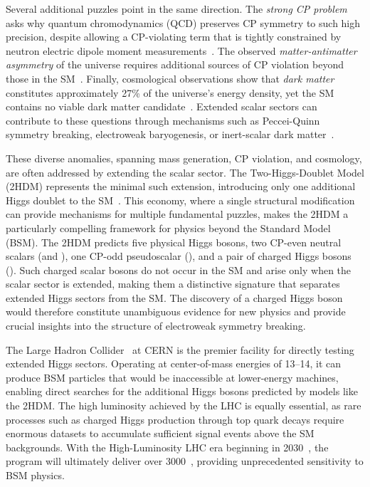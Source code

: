 Several additional puzzles point in the same direction. The \textit{strong CP problem} asks why quantum chromodynamics (QCD) preserves CP symmetry to such high precision, despite allowing a CP-violating term that is tightly constrained by neutron electric dipole moment measurements~\cite{Kim:2008hd,Abel:2020pzs}. The observed \textit{matter-antimatter asymmetry} of the universe requires additional sources of CP violation beyond those in the SM~\cite{Sakharov:1967dj}. Finally, cosmological observations show that \textit{dark matter} constitutes approximately 27\% of the universe's energy density, yet the SM contains no viable dark matter candidate~\cite{Planck:2018vyg}. Extended scalar sectors can contribute to these questions through mechanisms such as Peccei-Quinn symmetry breaking, electroweak baryogenesis, or inert-scalar dark matter~\cite{Peccei:1977hh,Peccei:1977ur,Morrissey:2012db,Deshpande:1977rw}.

These diverse anomalies, spanning mass generation, CP violation, and cosmology, are often addressed by extending the scalar sector. The Two-Higgs-Doublet Model (2HDM) represents the minimal such extension, introducing only one additional Higgs doublet to the SM~\cite{Branco:2011iw}. This economy, where a single structural modification can provide mechanisms for multiple fundamental puzzles, makes the 2HDM a particularly compelling framework for physics beyond the Standard Model (BSM). The 2HDM predicts five physical Higgs bosons, two CP-even neutral scalars (\Ph and \PH), one CP-odd pseudoscalar (\PA), and a pair of charged Higgs bosons (\PHpm). Such charged scalar bosons do not occur in the SM and arise only when the scalar sector is extended, making them a distinctive signature that separates extended Higgs sectors from the SM. The discovery of a charged Higgs boson would therefore constitute unambiguous evidence for new physics and provide crucial insights into the structure of electroweak symmetry breaking.

The Large Hadron Collider~\cite{Evans:2008zzb} at CERN is the premier facility for directly testing extended Higgs sectors. Operating at center-of-mass energies of 13--14\TeV, it can produce BSM particles that would be inaccessible at lower-energy machines, enabling direct searches for the additional Higgs bosons predicted by models like the 2HDM. The high luminosity achieved by the LHC is equally essential, as rare processes such as charged Higgs production through top quark decays require enormous datasets to accumulate sufficient signal events above the SM backgrounds. With the High-Luminosity LHC era beginning in 2030~\cite{HLLHC:TDR}, the program will ultimately deliver over 3000~\fbinv, providing unprecedented sensitivity to BSM physics.

